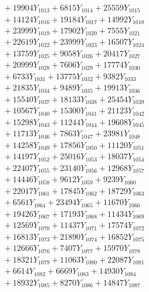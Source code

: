 \documentclass[a4paper,10pt]{article}
\begin{document}
{\begin{align}
&\;  + 19904 Y_{1013} + 6815 Y_{1014} + 25559 Y_{1015} \\[0.3ex]
&\;  + 14124 Y_{1016} + 19184 Y_{1017} + 14992 Y_{1018} \\[0.5ex]\allowbreak
&\;  + 23999 Y_{1019} + 17902 Y_{1020} + 7555 Y_{1021} \\[0.3ex]
&\;  + 22619 Y_{1022} + 23999 Y_{1023} + 16507 Y_{1024} \\[0.3ex]
&\;  + 13759 Y_{1025} + 9058 Y_{1026} + 20417 Y_{1027} \\[0.3ex]
&\;  + 20999 Y_{1028} + 7606 Y_{1029} + 17774 Y_{1030} \\[0.3ex]
&\;  + 6733 Y_{1031} + 13775 Y_{1032} + 9382 Y_{1033} \\[0.3ex]
&\;  + 21835 Y_{1034} + 9489 Y_{1035} + 19913 Y_{1036} \\[0.3ex]
&\;  + 15540 Y_{1037} + 18133 Y_{1038} + 25454 Y_{1039} \\[0.3ex]
&\;  + 10567 Y_{1040} + 15300 Y_{1041} + 21123 Y_{1042} \\[0.3ex]
&\;  + 15298 Y_{1043} + 11244 Y_{1044} + 19608 Y_{1045} \\[0.3ex]
&\;  + 11713 Y_{1046} + 7863 Y_{1047} + 23981 Y_{1048} \\[0.5ex]\allowbreak
&\;  + 14258 Y_{1049} + 17856 Y_{1050} + 11120 Y_{1051} \\[0.3ex]
&\;  + 14197 Y_{1052} + 25016 Y_{1053} + 18037 Y_{1054} \\[0.3ex]
&\;  + 22407 Y_{1055} + 23140 Y_{1056} + 12968 Y_{1057} \\[0.3ex]
&\;  + 14446 Y_{1058} + 9612 Y_{1059} + 9239 Y_{1060} \\[0.3ex]
&\;  + 22017 Y_{1061} + 17845 Y_{1062} + 18729 Y_{1063} \\[0.3ex]
&\;  + 6561 Y_{1064} + 23494 Y_{1065} + 11670 Y_{1066} \\[0.3ex]
&\;  + 19426 Y_{1067} + 17193 Y_{1068} + 11434 Y_{1069} \\[0.3ex]
&\;  + 12569 Y_{1070} + 11437 Y_{1071} + 17574 Y_{1072} \\[0.3ex]
&\;  + 16813 Y_{1073} + 21890 Y_{1074} + 16852 Y_{1075} \\[0.3ex]
&\;  + 12666 Y_{1076} + 7407 Y_{1077} + 15970 Y_{1078} \\[0.5ex]\allowbreak
&\;  + 18321 Y_{1079} + 11063 Y_{1080} + 22087 Y_{1081} \\[0.3ex]
&\;  + 6614 Y_{1082} + 6669 Y_{1083} + 14930 Y_{1084} \\[0.3ex]
&\;  + 18932 Y_{1085} + 8270 Y_{1086} + 14847 Y_{1087} \\[0.3ex]

\end{align}}
\end{document}
